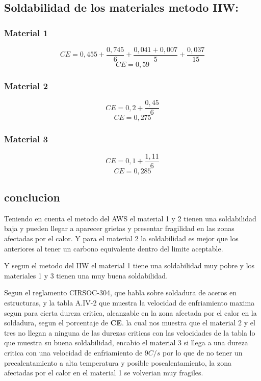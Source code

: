 \documentclass[12pt,a4paper]{article}
\begin{document}
\subsection{Soldabilidad de los materiales metodo IIW:}
\subsubsection{Material 1}
\begin{equation*}
    CE = 0,455 + \frac{0,745}{6} + \frac{0,041 + 0,007}{5} + \frac{0,037}{15}
\end{equation*}
\begin{equation*}
    CE = 0,59
\end{equation*}

\subsubsection{Material 2}
\begin{equation*}
    CE = 0,2 + \frac{0,45}{6} 
\end{equation*}
\begin{equation*}
    CE = 0,275
\end{equation*}

\subsubsection{Material 3}
\begin{equation*}
    CE = 0,1 + \frac{1,11}{6} 
\end{equation*}
\begin{equation*}
    CE = 0,285
\end{equation*}

\subsection{conclucion}
Teniendo en cuenta el metodo del AWS el material 1 y 2 tienen una soldabilidad baja y pueden llegar a aparecer grietas y presentar fragilidad en las zonas afectadas por el calor.
Y para el material 2 la soldabilidad es mejor que los anteriores al tener un carbono equivalente dentro del limite aceptable.

Y segun el metodo del IIW el material 1 tiene una soldabilidad muy pobre y los materiales 1 y 3 tienen una muy buena soldabilidad.

Segun el reglamento CIRSOC-304, que habla sobre soldadura de aceros en estructuras, y la tabla A.IV-2 que muestra la velocidad de enfriamiento maxima segun para cierta dureza critica, alcanzable en la zona afectada por el calor en la soldadura, segun el porcentaje de \textbf{CE}. la cual nos muestra que el material 2 y el tres no llegan a ninguna de las durezas criticas con las velocidades de la tabla lo que muestra su buena soldabilidad, encabio el material 3 si llega a una dureza critica con una velocidad de enfriamiento de 9$C/s$ por lo que de no tener un precalentamiento a alta temperatura y posible poscalentamiento, la zona afectadas por el calor en el material 1 se volverian muy fragiles.
\end{document}
